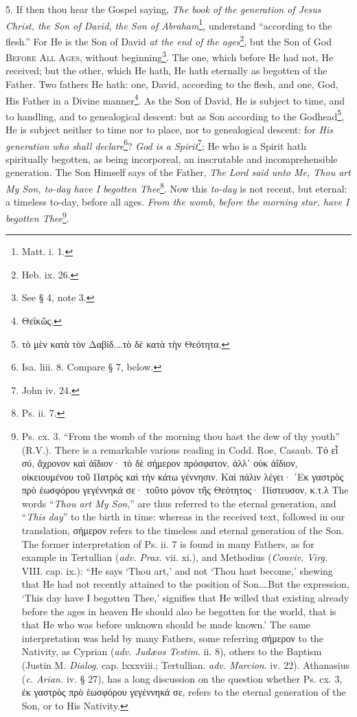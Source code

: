 5. If then thou hear the Gospel saying, \emph{The book of the generation of Jesus Christ, the Son of David, the Son of Abraham}\footnote{Matt. i. 1.}, understand “according to the flesh.” For He is the Son of David \emph{at the end of the ages}\footnote{Heb. ix. 26.}, but the Son of God \textsc{Before All Ages}, without beginning\footnote{See § 4, note 3.}. The one, which before He had not, He received; but the other, which He hath, He hath eternally as begotten of the Father. Two fathers He hath: one, David, according to the flesh, and one, God, His Father in a Divine manner\footnote{\textgreek{Θεϊκῶς}.}. As the Son of David, He is subject to time, and to handling, and to genealogical descent: but as Son according to the Godhead\footnote{\textgreek{τὸ μὲν κατὰ τὸν Δαβίδ.…τὸ δὲ κατὰ τὴν Θεότητα}.}, He is subject neither to time nor to place, nor to genealogical descent: for \emph{His generation who shall declare}\footnote{Isa. liii. 8. Compare § 7, below.}? \emph{God is a Spirit}\footnote{John iv. 24.}; He who is a Spirit hath spiritually begotten, as being incorporeal, an inscrutable and incomprehensible generation. The Son Himself says of the Father, \emph{The Lord said unto Me, Thou art My Son, to-day have I begotten Thee}\footnote{Ps. ii. 7.}. Now this \emph{to-day} is not recent, but eternal: a timeless to-day, before all ages. \emph{From the womb, before the morning star, have I begotten Thee}\footnote{Ps. cx. 3. “From the womb of the morning thou hast the dew of thy youth” (\textsc{R.V.}). There is a remarkable various reading in Codd. Roe, Casaub. \textgreek{Τό εἶ σύ, ἄχρονον καὶ ἀΐδιον· τὸ δὲ σήμερον πρόσφατον, ἀλλ᾽ οὐκ ἀΐδιον, οἰκειουμένου τοῦ Πατρὸς καὶ τὴν κάτω γέννησιν. Καὶ πάλιν λέγει· ᾽Εκ γαστρὸς πρὸ ἑωσφόρου γεγέννηκά σε· τοῦτο μόνον τῆς Θεότητος· Πίστευσον, κ.τ.λ} The words “\emph{Thou art My Son},” are thus referred to the eternal generation, and “\emph{This day}” to the birth in time: whereas in the received text, followed in our translation, \textgreek{σήμερον} refers to the timeless and eternal generation of the Son. The former interpretation of Ps. ii. 7 is found in many Fathers, as for example in Tertullian (\emph{adv. Prax.} vii. xi.), and Methodius (\emph{Conviv. Virg.} VIII. cap. ix.): “He says ‘Thou art,’ and not ‘Thou hast become,’ shewing that He had not recently attained to the position of Son.…But the expression, ‘This day have I begotten Thee,’ signifies that He willed that existing already before the ages in heaven He should also be begotten for the world, that is that He who was before unknown should be made known.’ The same interpretation was held by many Fathers, some referring \textgreek{σήμερον} to the Nativity, as Cyprian (\emph{adv. Judæos Testim}. ii. 8), others to the Baptism (Justin M. \emph{Dialog}. cap. lxxxviii.; Tertullian. \emph{adv. Marcion}. iv. 22). Athanasius (\emph{c. Arian.} iv. § 27), has a long discussion on the question whether Ps. cx. 3, \textgreek{ἐκ γαστρὸς πρὸ ἑωσφόρου γεγέννηκά σε}, refers to the eternal generation of the Son, or to His Nativity.}.

